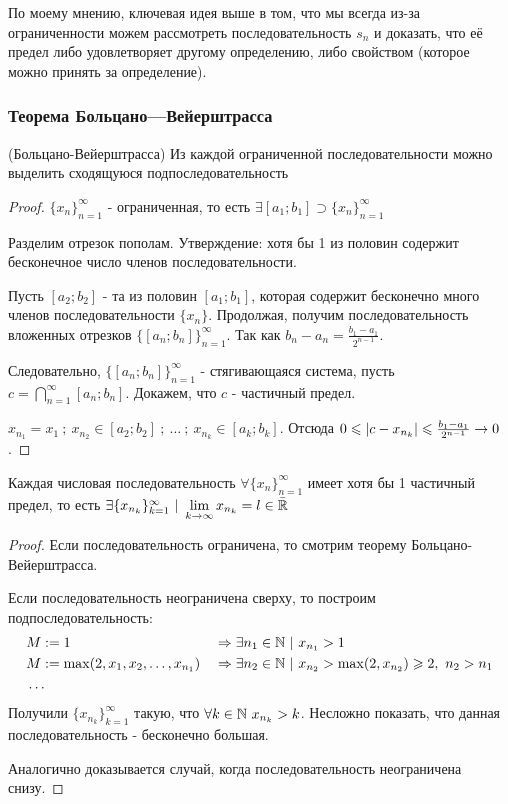\begin{anote}
	По моему мнению, ключевая идея выше в том, что мы всегда из-за ограниченности можем рассмотреть последовательность $s_n$ и доказать, что её предел либо удовлетворяет другому определению, либо свойством (которое можно принять за определение).
\end{anote}


\subsubsection{Теорема Больцано—Вейерштрасса}
\begin{theorem} (Больцано-Вейерштрасса)
	Из каждой ограниченной последовательности можно выделить сходящуюся подпоследовательность
\end{theorem}

\begin{proof}
	$\{x_n\}_{n = 1}^\infty$ - ограниченная, то есть $\exists [a_1; b_1] \supset \{x_n\}_{n = 1}^\infty$
	
	Разделим отрезок пополам. Утверждение: хотя бы 1 из половин содержит бесконечное число членов последовательности.
	
	Пусть $[a_2; b_2]$ - та из половин $[a_1; b_1]$, которая содержит бесконечно много членов последовательности $\{x_n\}$. Продолжая, получим последовательность вложенных отрезков $\{[a_n; b_n]\}_{n = 1}^\infty$. Так как $b_n - a_n = \frac{b_1 - a_1}{2^{n - 1}}$.
	
	Следовательно, $\{[a_n; b_n]\}_{n = 1}^\infty$ - стягивающаяся система, пусть $c = \bigcap\limits_{n = 1}^\infty [a_n; b_n]$. Докажем, что $c$ - частичный предел.
	
	$x_{n_1} = x_1\ ;\ x_{n_2} \in [a_2; b_2]\ ;\ \dots\ ;\ x_{n_k} \in [a_k; b_k]$. Отсюда $0 \leqslant |c - x_{n_k}| \leqslant \frac{b_1 - a_1}{2^{n - 1}} \rightarrow 0$.
\end{proof}

\begin{addition}
	Каждая числовая последовательность $\forall \{x_n\}_{n = 1}^\infty$ имеет хотя бы 1 частичный предел, то есть $\exists \{x_{n_k}\}_{k = 1}^\infty\ |\ \lim\limits_{k \rightarrow \infty} x_{n_k} = l \in \bar{\mathbb{R}}$
\end{addition}

\begin{proof}
	Если последовательность ограничена, то смотрим теорему Больцано-Вейерштрасса.
	
	Если последовательность неограничена сверху, то построим подпоследовательность:
	\begin{align*}
		&M := 1 & &\Rightarrow \exists n_1 \in \mathbb{N}\ |\ x_{n_1} > 1
		\\
		&M := \max(2, x_1, x_2, \dots, x_{n_1}) & &\Rightarrow \exists n_2 \in \mathbb{N}\ |\ x_{n_2} > \max(2, x_{n_2}) \geqslant 2,\ n_2 > n_1
		\\
		&\dots
	\end{align*}
	Получили $\{x_{n_k}\}_{k = 1}^\infty$ такую, что $\forall k \in \mathbb{N}\ x_{n_k} > k$. Несложно показать, что данная последовательность - бесконечно большая.
	
	Аналогично доказывается случай, когда последовательность неограничена снизу.
\end{proof}

